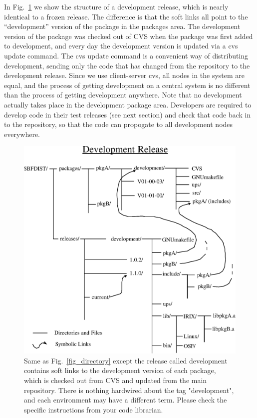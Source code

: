 \documentclass[12pt]{article}
\begin{document}
In Fig.~\ref{fig_development_release} we show the structure of a development
release, which is nearly identical to a frozen release.  The difference is that
the soft links all point to the ``development'' version of the package in the
packages area.  The development version of the package was checked out of
CVS when the package was first added to development, and every day the 
development version is updated via a {\ttfamily cvs update} command. The 
{\ttfamily cvs update} command is a convenient way of distributing 
development, sending only the code that has changed from the repository to the 
development release.  Since we use client-server cvs, all nodes in the system 
are equal, and the process of getting development on a central system is no 
different than the process of getting development anywhere.  Note that no
development actually takes place in the development package area. Developers
are required to develop code in their test releases (see next section) and check
that code back in to the repository, so that the code can propogate to all
development nodes everywhere. 

\begin{figure}[tbh]
\centerline{\includegraphics[width=4.5in]{development_release.eps}}
\vspace*{-0.5in}
\caption[Development Release Directory Structure]{ 
Same as Fig.~\ref{fig_directory} except the release called development
contains soft links to the development version of each package, which is 
checked out from CVS and updated from the main repository. There is nothing
hardwired about the tag "development", and each environment may have a 
different term. Please check the specific instructions from your code 
librarian.}
\label{fig_development_release}
\end{figure}
\end{document}
